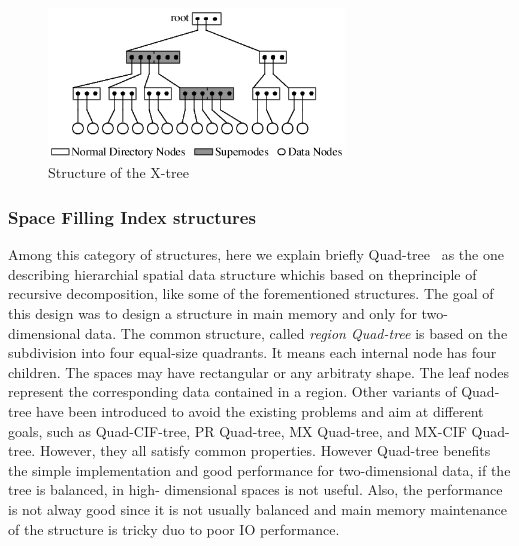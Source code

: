 \documentclass[a4paper,12pt]{article}
\begin{document}
\begin{figure}
\centering
\includegraphics[width=0.7\textwidth]{xtree}
\caption{Structure of the X-tree}
\label{figxtree}
\end{figure}

\subsubsection{Space Filling Index structures}
\label{quad-tree-based}
Among this category of structures, here we explain briefly Quad-tree~\cite{quadtree} as the one describing hierarchial spatial data structure whichis based on theprinciple of recursive decomposition, like some of the forementioned structures. The goal of this design was to design a structure in main memory and only for two-dimensional data. The common structure, called \textit{region Quad-tree} is based on the subdivision into four equal-size quadrants. It means each internal node has four children. The spaces may have rectangular or any arbitraty shape. The leaf nodes represent the corresponding data contained in a region. 
Other variants of Quad-tree have been introduced to avoid the existing problems and aim at different goals, such as Quad-CIF-tree, PR Quad-tree, MX Quad-tree, and MX-CIF Quad-tree. However, they all satisfy common properties. 
However Quad-tree benefits the simple implementation and good performance for two-dimensional data, if the tree is balanced, in high- dimensional spaces is not useful. Also, the performance is not alway good since it is not usually balanced and main memory maintenance of the structure is tricky duo to poor IO performance. 
\end{document}
